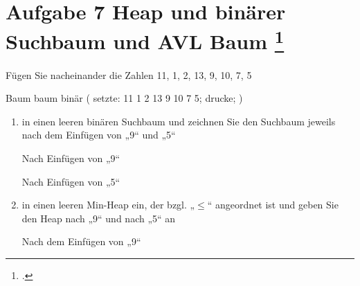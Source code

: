 \documentclass{lehramt-informatik-aufgabe}
\begin{document}
\section{Aufgabe 7 Heap und binärer Suchbaum und AVL Baum
\footcite{46115:2014:03}}

Fügen Sie nacheinander die Zahlen 11, 1, 2, 13, 9, 10, 7, 5

\begin{liProjektSprache}{Baum}
baum binär (
  setzte: 11 1 2 13 9 10 7 5;
  drucke;
)
\end{liProjektSprache}

\begin{enumerate}


\item in einen leeren binären Suchbaum und zeichnen Sie den Suchbaum
jeweils nach dem Einfügen von „9“ und „5“

\begin{liDiagramm}{Nach Einfügen von „9“}
\end{liDiagramm}

\begin{liDiagramm}{Nach Einfügen von „5“}
\end{liDiagramm}


\item in einen leeren Min-Heap ein, der bzgl. „$\leq$“ angeordnet ist und
geben Sie den Heap nach „9“ und nach „5“ an

\begin{liDiagramm}{Nach dem Einfügen von „9“}
\end{liDiagramm}


\end{enumerate}
\end{document}
